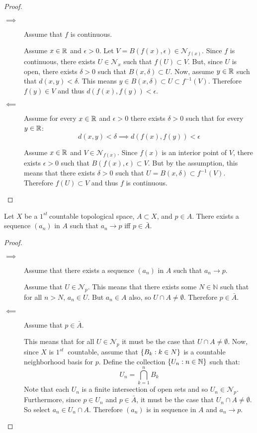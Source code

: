 \documentclass[letterpaper,12pt,fleqn]{article}
\renewcommand{\N}{\mathcal{N}}
\newcommand{\nat}{\mathbb{N}}
\newcommand{\e}{\epsilon}
\renewcommand{\d}{\delta}
\newcommand{\f}{\(1^{st}\ \)}
\begin{document}
\begin{proof}
  \begin{description}
  \item[]
  \item[\(\implies\)] Assume that \(f\) is continuous.

    Assume \(x\in\mathbb{R}\) and \(\e>0\).  Let \(V=B(f(x),\e)\in\N_{f(x)}\).  Since \(f\) is continuous, there exists
    \(U\in\N_x\) such that \(f(U)\subset V\).  But, since \(U\) is open, there exists \(\d>0\) such that
    \(B(x,\d)\subset U\).  Now, assume \(y\in\mathbb{R}\) such that \(d(x,y)<\d\).  This means
    \(y\in B(x,\d)\subset U\subset f^{-1}(V)\).  Therefore \(f(y)\in V\) and thus \(d(f(x),f(y))<\e\).

  \item[\(\impliedby\)] Assume for every \(x\in\mathbb{R}\) and \(\e>0\) there exists \(\d>0\) such that for every \(y\in\mathbb{R}\):
    \[d(x,y)<\d\implies d(f(x),f(y))<\e\]

    Assume \(x\in\mathbb{R}\) and \(V\in\N_{f(x)}\).  Since \(f(x)\) is an interior point of \(V\), there exists \(\e>0\)
    such that \(B(f(x),\e)\subset V\).  But by the assumption, this means that there exists \(\d>0\) such that
    \(U=B(x,\d)\subset f^{-1}(V)\).  Therefore \(f(U)\subset V\) and thus \(f\) is continuous.
  \end{description}
\end{proof}

\begin{lemma}
  Let \(X\) be a \f countable topological space, \(A\subset X\), and \(p\in A\).  There exists a sequence
  \((a_n)\) in \(A\) such that \(a_n\to p\) iff \(p\in\bar{A}\).
\end{lemma}

\begin{proof}
  \begin{description}
  \item[]
  \item[\(\implies\)] Assume that there exists a sequence \((a_n)\) in \(A\) such that \(a_n\to p\).

    Assume that \(U\in\N_p\).  This means that there exists some \(N\in\nat\) such that for all \(n>N\),
    \(a_n\in U\).  But \(a_n\in A\) also, so \(U\cap A\ne\emptyset\).  Therefore \(p\in\bar{A}\).

  \item[\(\impliedby\)] Assume that \(p\in\bar{A}\).

    This means that for all \(U\in\N_p\) it must be the case that \(U\cap A\ne\emptyset\).  Now, since \(X\) is \f
    countable, assume that \(\{B_k:k\in N\}\) is a countable neighborhood basis for \(p\).  Define the collection
    \(\set{U_n:n\in\nat}\) such that:
    \[U_n=\bigcap_{k=1}^nB_k\]
    Note that each \(U_n\) is a finite intersection of open sets and so \(U_n\in\N_p\).  Furthermore, since
    \(p\in U_n\) and \(p\in\bar{A}\), it must be the case that \(U_n\cap A\ne\emptyset\).  So select
    \(a_n\in U_n\cap A\).  Therefore \((a_n)\) is in sequence in \(A\) and \(a_n\to p\).
  \end{description}
\end{proof}
\end{document}
